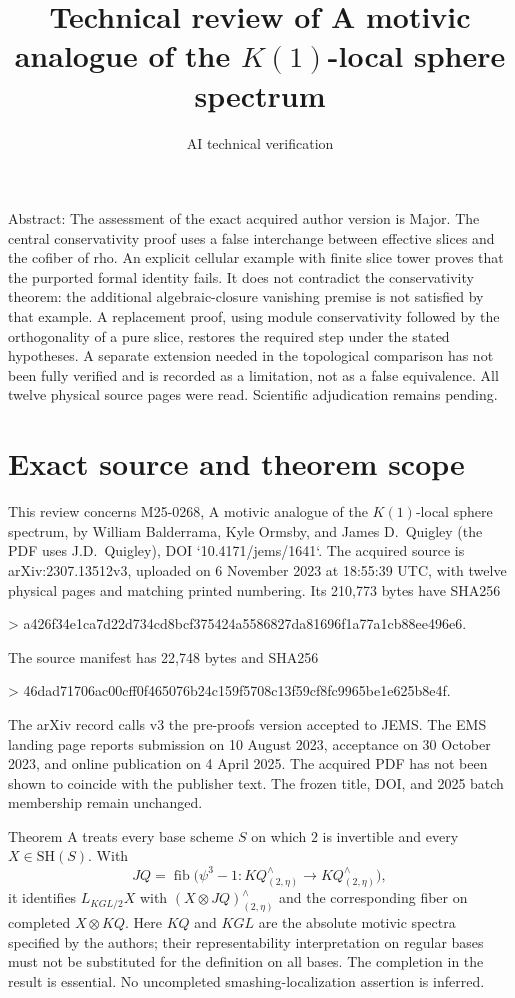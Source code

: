 \documentclass[10pt]{article}
\title{Technical review of
A motivic analogue of the \(K(1)\)-local sphere spectrum}
\author{AI technical verification}
\date{}
\begin{document}
\maketitle
Abstract: The assessment of the exact acquired author version is Major. The central conservativity proof uses a false interchange between effective slices and the cofiber of rho. An explicit cellular example with finite slice tower proves that the purported formal identity fails. It does not contradict the conservativity theorem: the additional algebraic-closure vanishing premise is not satisfied by that example. A replacement proof, using module conservativity followed by the orthogonality of a pure slice, restores the required step under the stated hypotheses. A separate extension needed in the topological comparison has not been fully verified and is recorded as a limitation, not as a false equivalence. All twelve physical source pages were read. Scientific adjudication remains pending.\par
\section*{Exact source and theorem scope}
This review concerns M25-0268, A motivic analogue of the \(K(1)\)-local sphere spectrum, by William Balderrama, Kyle Ormsby, and James D. Quigley (the PDF uses J.D. Quigley), DOI `10.4171/jems/1641`. The acquired source is arXiv:2307.13512v3, uploaded on 6 November 2023 at 18:55:39 UTC, with twelve physical pages and matching printed numbering. Its 210,773 bytes have SHA256\par
> a426f34e1ca7d22d734cd8bcf375424a5586827da81696f1a77a1cb88ee496e6.\par
The source manifest has 22,748 bytes and SHA256\par
> 46dad71706ac00cff0f465076b24c159f5708c13f59cf8fc9965be1e625b8e4f.\par
The arXiv record calls v3 the pre-proofs version accepted to JEMS. The EMS landing page reports submission on 10 August 2023, acceptance on 30 October 2023, and online publication on 4 April 2025. The acquired PDF has not been shown to coincide with the publisher text. The frozen title, DOI, and 2025 batch membership remain unchanged.\par
Theorem A treats every base scheme \(S\) on which \(2\) is invertible and every \(X\in\mathrm{SH}(S)\). With \[JQ=\mathop{\mathrm{fib}}\bigl(\psi^3-1:KQ^\wedge_{(2,\eta)}
                  \longrightarrow KQ^\wedge_{(2,\eta)}\bigr),\] it identifies \(L_{KGL/2}X\) with \((X\otimes JQ)^\wedge_{(2,\eta)}\) and the corresponding fiber on completed \(X\otimes KQ\). Here \(KQ\) and \(KGL\) are the absolute motivic spectra specified by the authors; their representability interpretation on regular bases must not be substituted for the definition on all bases. The completion in the result is essential. No uncompleted smashing-localization assertion is inferred.\par
\end{document}
